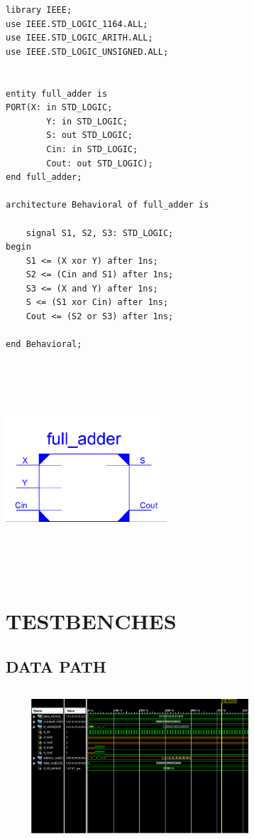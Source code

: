 \documentclass{article}
\begin{document}
\begin{lstlisting}
library IEEE;
use IEEE.STD_LOGIC_1164.ALL;
use IEEE.STD_LOGIC_ARITH.ALL;
use IEEE.STD_LOGIC_UNSIGNED.ALL;


entity full_adder is
PORT(X: in STD_LOGIC;
		Y: in STD_LOGIC;
		S: out STD_LOGIC;
		Cin: in STD_LOGIC;
		Cout: out STD_LOGIC);
end full_adder;

architecture Behavioral of full_adder is

	signal S1, S2, S3: STD_LOGIC;
begin
	S1 <= (X xor Y) after 1ns;
	S2 <= (Cin and S1) after 1ns;
	S3 <= (X and Y) after 1ns;
	S <= (S1 xor Cin) after 1ns;
	Cout <= (S2 or S3) after 1ns;

end Behavioral;
\end{lstlisting}

\includegraphics[width=6cm, height=8cm]{adder.png}
\pagebreak

\section{TESTBENCHES}

\subsection{DATA PATH}\label{sec:result}

\begin{lstlisting}

\end{lstlisting}
\includegraphics[width=10cm, height=5cm]{test_data.png}
\pagebreak
\end{document}
